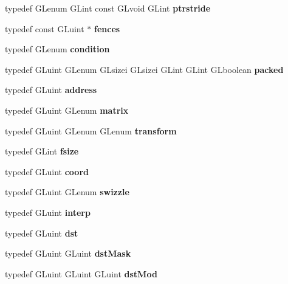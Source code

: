 \begin{DoxyCompactItemize}
\item 
typedef G\+Lenum G\+Lint const G\+Lvoid G\+Lint {\bfseries ptrstride}\label{_s_d_l__opengl_8h_a723f77c092f9e8f44d8883932a64bfdf}

\item 
typedef const G\+Luint $\ast$ {\bfseries fences}\label{_s_d_l__opengl_8h_a91edcae3a89d999c4bdc87398fee9451}

\item 
typedef G\+Lenum {\bfseries condition}\label{_s_d_l__opengl_8h_a3fd7759b3d6e5284475eee14a613b9f9}

\item 
typedef G\+Luint G\+Lenum G\+Lsizei G\+Lsizei G\+Lint G\+Lint G\+Lboolean {\bfseries packed}\label{_s_d_l__opengl_8h_ae1a14bfbe53957836e1fa28741e673af}

\item 
typedef G\+Luint {\bfseries address}\label{_s_d_l__opengl_8h_a86e3d190561a4ae1e195e1a2bcc83db5}

\item 
typedef G\+Luint G\+Lenum {\bfseries matrix}\label{_s_d_l__opengl_8h_a7b24a3f2f56eb1244ae69dacb4fecb6f}

\item 
typedef G\+Luint G\+Lenum G\+Lenum {\bfseries transform}\label{_s_d_l__opengl_8h_a07993c0d92c1aeeb357ba0495c8b5325}

\item 
typedef G\+Lint {\bfseries fsize}\label{_s_d_l__opengl_8h_af920e4f35bb93c40a9b337d6ad5378b8}

\item 
typedef G\+Luint {\bfseries coord}\label{_s_d_l__opengl_8h_a4ad6f000813afde2b5727cbfdddc75be}

\item 
typedef G\+Luint G\+Lenum {\bfseries swizzle}\label{_s_d_l__opengl_8h_a320af4389dfb5556a1049053d79f8ec5}

\item 
typedef G\+Luint {\bfseries interp}\label{_s_d_l__opengl_8h_a8df6d532843e6b3c43d14798522b9f44}

\item 
typedef G\+Luint {\bfseries dst}\label{_s_d_l__opengl_8h_a92034251bfd455d524a9b5610cddba00}

\item 
typedef G\+Luint G\+Luint {\bfseries dst\+Mask}\label{_s_d_l__opengl_8h_a194b4a6b2c39e66f279c98ce63946846}

\item 
typedef G\+Luint G\+Luint G\+Luint {\bfseries dst\+Mod}\label{_s_d_l__opengl_8h_afcd7b5ae4d6e78ff51977e23c0e8084c}


\end{DoxyCompactItemize}
